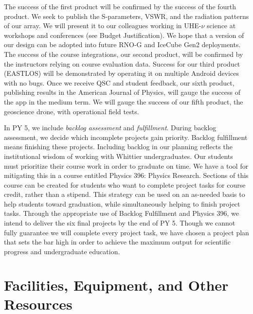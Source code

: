 \documentclass[11pt]{amsart}
\begin{document}
The success of the first product will be confirmed by the success of the fourth product.  We seek to publish the S-parameters, VSWR, and the radiation patterns of our array.  We will present it to our colleagues working in UHE-$\nu$ science at workshops and conferences (see Budget Justification).  We hope that a version of our design can be adopted into future RNO-G and IceCube Gen2 deployments.  The success of the course integrations, our second product, will be confirmed by the instructors relying on course evaluation data.  Success for our third product (EASTLOS) will be demonstrated by operating it on multiple Android devices with no bugs.  Once we receive QSC and student feedback, our sixth product, publishing results in the American Journal of Physics, will gauge the success of the app in the medium term.  We will gauge the success of our fifth product, the geoscience drone, with operational field tests.

In PY 5, we include \textit{backlog assessment} and \textit{fulfillment}.  During backlog assessment, we decide which incomplete projects gain priority.  Backlog fulfillment means finishing these projects.  Including backlog in our planning reflects the institutional wisdom of working with Whittier undergraduates.  Our students must prioritize their course work in order to graduate on time.  We have a tool for mitigating this in a course entitled Physics 396: Physics Research.  Sections of this course can be created for students who want to complete project tasks for course credit, rather than a stipend.  This strategy can be used on an as-needed basis to help students toward graduation, while simultaneously helping to finish project tasks.  Through the appropriate use of Backlog Fulfillment and Physics 396, we intend to deliver the six final projects by the end of PY 5.  Though we cannot fully guarantee we will complete every project task, we have chosen a project plan that sets the bar high in order to achieve the maximum output for scientific progress and undergraduate education.

\clearpage

\section{Facilities, Equipment, and Other Resources}
\end{document}

